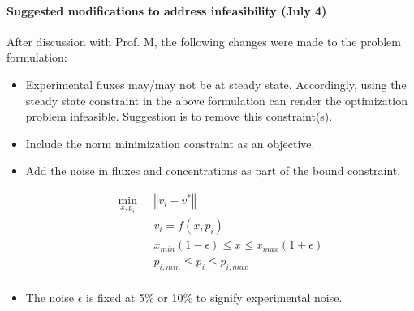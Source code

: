 \documentclass[10pt]{report}
\begin{document}
	\paragraph{Suggested modifications to address infeasibility (July 4)}
	After discussion with Prof. M, the following changes were made to the problem formulation:
	\begin{itemize}
		\item Experimental fluxes may/may not be at steady state. Accordingly, using the steady state constraint in the above formulation can render the optimization problem infeasible. Suggestion is to remove this constraint(s).
		\item Include the norm minimization constraint as an objective.
		\item Add the noise in fluxes and concentrations as part of the bound constraint.
		\begin{center}
			\begin{subequations}
				\begin{align}
				\underset{x,p_i}{\mathrm{min}} & \text{      }\left\Vert v_i-v^*\right\Vert\\
				& \text{      }v_i = f(x,p_i)\\
				& \text{      }x_{min}(1-\epsilon)\le x \le x_{max}(1+\epsilon)\\
				& \text{      }p_{i,min} \le p_i \le p_{i,max}\\
				\end{align}
			\end{subequations}
		\end{center}
	\item The noise $\epsilon$ is fixed at 5\% or 10\% to signify experimental noise.
	\end{itemize}
	
\end{document}
